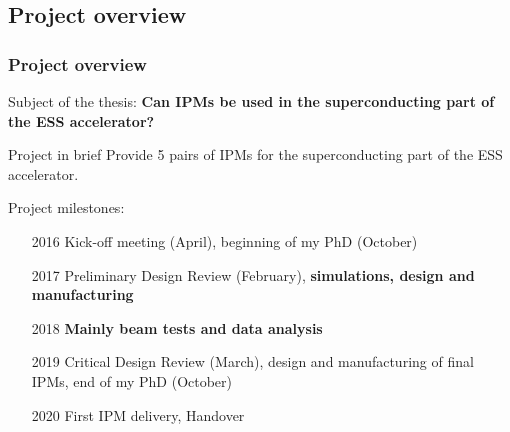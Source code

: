 \subsection{Project overview}
\begin{frame}[t]
  \frametitle{Project overview}
  \begin{alertblock}{Subject of the thesis:}
    \textbf{Can IPMs be used in the superconducting part of the ESS accelerator?}
  \end{alertblock}
  \begin{block}{Project in brief}
    Provide 5 pairs of IPMs for the superconducting part of the ESS accelerator.

    Project milestones:
    \begin{itemize}
      \item[2016] Kick-off meeting (April), beginning of my PhD (October)
      \item[2017] Preliminary Design Review (February), \textbf{simulations, design and manufacturing}
      \item[2018] \textbf{Mainly beam tests and data analysis}
      \item[2019] Critical Design Review (March), design and manufacturing of final IPMs, end of my PhD (October)
      \item[2020] First IPM delivery, Handover
    \end{itemize}
  \end{block}
\end{frame}